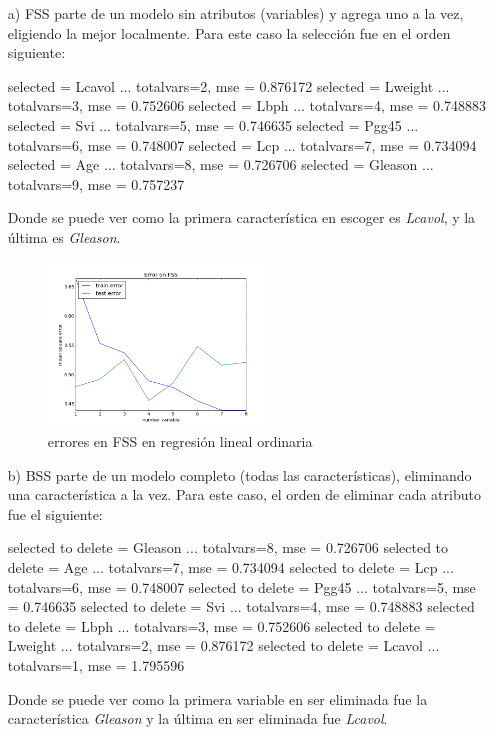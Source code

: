 \documentclass[10pt]{article}
\begin{document}
\begin{itemize}
\item[a)] FSS parte de un modelo sin atributos (variables) y agrega uno a la vez, eligiendo la mejor localmente. Para este caso la selección fue en el orden siguiente:

selected = Lcavol ...
totalvars=2, mse = 0.876172
selected = Lweight ...
totalvars=3, mse = 0.752606
selected = Lbph ...
totalvars=4, mse = 0.748883
selected = Svi ...
totalvars=5, mse = 0.746635
selected = Pgg45 ...
totalvars=6, mse = 0.748007
selected = Lcp ...
totalvars=7, mse = 0.734094
selected = Age ...
totalvars=8, mse = 0.726706
selected = Gleason ...
totalvars=9, mse = 0.757237

Donde se puede ver como la primera característica en escoger es \textit{Lcavol}, y la última es \textit{Gleason}.

\begin{figure}[h]
    \centering
    \includegraphics[width=0.55\textwidth]{images/fss}
    \caption{errores en FSS en regresión lineal ordinaria}
    \label{fig:mesh1}
\end{figure}


\item[b)] BSS parte de un modelo completo (todas las características), eliminando una característica a la vez. Para este caso, el orden de eliminar cada atributo fue el siguiente:

selected to delete = Gleason ...
totalvars=8, mse = 0.726706
selected to delete = Age ...
totalvars=7, mse = 0.734094
selected to delete = Lcp ...
totalvars=6, mse = 0.748007
selected to delete = Pgg45 ...
totalvars=5, mse = 0.746635
selected to delete = Svi ...
totalvars=4, mse = 0.748883
selected to delete = Lbph ...
totalvars=3, mse = 0.752606
selected to delete = Lweight ...
totalvars=2, mse = 0.876172
selected to delete = Lcavol ...
totalvars=1, mse = 1.795596

Donde se puede ver como la primera variable en ser eliminada fue la característica \textit{Gleason} y la última en ser eliminada fue \textit{Lcavol}.


\end{itemize}
\end{document}
